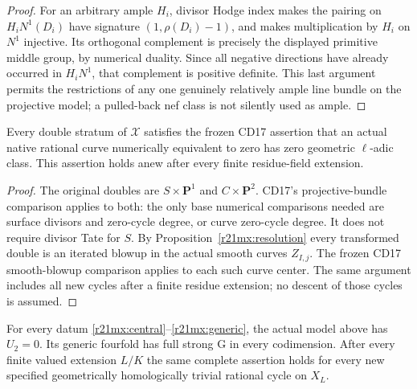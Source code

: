 \begin{proof}
For an arbitrary ample $H_i$, divisor Hodge index makes the pairing
on $H_iN^1(D_i)$ have signature $(1,\rho(D_i)-1)$, and makes
multiplication by $H_i$ on $N^1$ injective.  Its orthogonal complement
is precisely the displayed primitive middle group, by numerical
duality.  Since all negative directions have already occurred in
$H_iN^1$, that complement is positive definite.  This last argument
permits the restrictions of any one genuinely relatively ample
line bundle on the projective model; a pulled-back nef class is not
silently used as ample.
\end{proof}

\begin{lemma}
\label{r21mx:double}
Every double stratum of $\mathcal X$ satisfies the frozen CD17
assertion that an actual native rational curve numerically equivalent
to zero has zero geometric $\ell$-adic class.  This assertion holds
anew after every finite residue-field extension.
\end{lemma}

\begin{proof}
The original doubles are $S\times\mathbf P^1$ and
$C\times\mathbf P^2$.  CD17's projective-bundle comparison applies
to both: the only base numerical comparisons needed are surface
divisors and zero-cycle degree, or curve zero-cycle degree.  It does
not require divisor Tate for $S$.  By
Proposition~\ref{r21mx:resolution} every transformed double is an
iterated blowup in the actual smooth curves $Z_{I,j}$.  The frozen
CD17 smooth-blowup comparison applies to each such curve center.
The same argument includes all new cycles after a finite residue
extension; no descent of those cycles is assumed.
\end{proof}

\begin{theorem}
\label{r21mx:green}
For every datum \eqref{r21mx:central}--\eqref{r21mx:generic}, the
actual model above has $U_2=0$.  Its generic fourfold has full strong G
in every codimension.  After every finite valued extension $L/K$ the
same complete assertion holds for every new specified geometrically
homologically trivial rational cycle on $X_L$.
\end{theorem}


